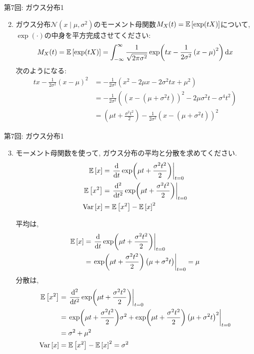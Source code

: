 \documentclass[dvipdfmx,notheorems,t]{beamer}
\begin{document}
\begin{frame}{第7回: ガウス分布1}
\begin{enumerate}
  \setcounter{enumi}{1}
  \item ガウス分布$\mathcal{N}(x \mid \mu, \sigma^2)$のモーメント母関数$M_X(t) = \operatorname{\mathbb{E}} \left[ \exp(tX) \right]$について,
  $\exp(\cdot)$の中身を平方完成させてください:
  \begin{align*}
    M_X(t) = \operatorname{\mathbb{E}} \left[ \exp(tX) \right] = \int_{-\infty}^\infty \frac{1}{\sqrt{2\pi \sigma^2}}
      \exp(tx -\frac{1}{2 \sigma^2} \left( x - \mu \right)^2) \dd{x}
  \end{align*}
  次のようになる:
  \begin{align*}
    tx - \frac{1}{2 \sigma^2} \left( x - \mu \right)^2
    &= -\frac{1}{2 \sigma^2} \left( x^2 - 2 \mu x - 2 \sigma^2 tx + \mu^2 \right) \\
    &= -\frac{1}{2 \sigma^2} \left( \left( x - \left( \mu + \sigma^2 t \right) \right)^2
      - 2 \mu \sigma^2 t - \sigma^4 t^2 \right) \\
    &= \left( \mu t + \frac{\sigma^2 t^2}{2} \right)
      -\frac{1}{2 \sigma^2} \left( x - \left( \mu + \sigma^2 t \right) \right)^2
  \end{align*}
\end{enumerate}
\end{frame}

\begin{frame}{第7回: ガウス分布1}
\begin{enumerate}
  \setcounter{enumi}{2}
  \item モーメント母関数を使って, ガウス分布の平均と分散を求めてください.
  \begin{align*}
    \operatorname{\mathbb{E}} \left[ x \right] &= \left. \dv{t} \exp(\mu t + \frac{\sigma^2 t^2}{2}) \right|_{t = 0} \\
    \operatorname{\mathbb{E}} \left[ x^2 \right] &= \left. \dv[2]{t} \exp(\mu t + \frac{\sigma^2 t^2}{2}) \right|_{t = 0} \\
    \operatorname{Var} \left[ x \right] &= \operatorname{\mathbb{E}} \left[ x^2 \right] - \operatorname{\mathbb{E}} \left[ x \right]^2
  \end{align*}

  \newpage
  平均は,
  \begin{align*}
    \operatorname{\mathbb{E}} \left[ x \right] &= \left. \dv{t} \exp(\mu t + \frac{\sigma^2 t^2}{2}) \right|_{t = 0} \\
      &= \left. \exp(\mu t + \frac{\sigma^2 t^2}{2}) \left( \mu + \sigma^2 t \right) \right|_{t = 0}
      = \mu
  \end{align*}
  分散は,
  \begin{align*}
    \operatorname{\mathbb{E}} \left[ x^2 \right] &= \left. \dv[2]{t} \exp(\mu t + \frac{\sigma^2 t^2}{2}) \right|_{t = 0} \\
      &= \left. \exp(\mu t + \frac{\sigma^2 t^2}{2}) \sigma^2 +
        \exp(\mu t + \frac{\sigma^2 t^2}{2}) \left( \mu + \sigma^2 t \right)^2 \right|_{t = 0} \\
      &= \sigma^2 + \mu^2 \\
    \operatorname{Var} \left[ x \right] &= \operatorname{\mathbb{E}} \left[ x^2 \right] - \operatorname{\mathbb{E}} \left[ x \right]^2 = \sigma^2
  \end{align*}
\end{enumerate}
\end{frame}
\end{document}
